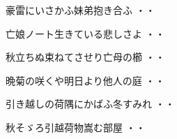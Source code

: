 \begin{shiika}豪雷にいさかふ妹弟抱き合ふ
\hfill{・・}\end{shiika}
\begin{shiika}亡娘ノート生きている悲しさよ
\hfill{・・}\end{shiika}
\begin{shiika}秋立ちぬ束ねてさせり亡母の櫛
\hfill{・・}\end{shiika}
\begin{shiika}晩菊の咲くや明日より他人の庭
\hfill{・・}\end{shiika}
\begin{shiika}引き越しの荷隅にかばふ冬すみれ
\hfill{・・}\end{shiika}
\begin{shiika}秋そゞろ引越荷物嵩む部屋
\hfill{・・}\end{shiika}

